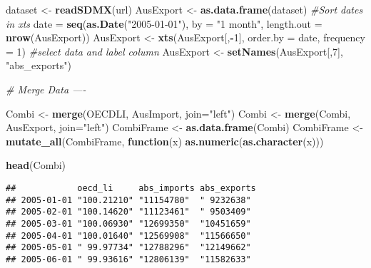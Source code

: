 \documentclass[]{article}
\newenvironment{Shaded}{\begin{snugshade}}{\end{snugshade}}
\newcommand{\KeywordTok}[1]{\textcolor[rgb]{0.13,0.29,0.53}{\textbf{#1}}}
\newcommand{\DataTypeTok}[1]{\textcolor[rgb]{0.13,0.29,0.53}{#1}}
\newcommand{\DecValTok}[1]{\textcolor[rgb]{0.00,0.00,0.81}{#1}}
\newcommand{\StringTok}[1]{\textcolor[rgb]{0.31,0.60,0.02}{#1}}
\newcommand{\CommentTok}[1]{\textcolor[rgb]{0.56,0.35,0.01}{\textit{#1}}}
\newcommand{\ControlFlowTok}[1]{\textcolor[rgb]{0.13,0.29,0.53}{\textbf{#1}}}
\newcommand{\OperatorTok}[1]{\textcolor[rgb]{0.81,0.36,0.00}{\textbf{#1}}}
\newcommand{\NormalTok}[1]{#1}
\begin{document}
\begin{Shaded}
\begin{Highlighting}[]
\NormalTok{dataset <-}\StringTok{ }\KeywordTok{readSDMX}\NormalTok{(url)}
\NormalTok{AusExport <-}\StringTok{ }\KeywordTok{as.data.frame}\NormalTok{(dataset)}
\CommentTok{#Sort dates in xts}
\NormalTok{date =}\StringTok{ }\KeywordTok{seq}\NormalTok{(}\KeywordTok{as.Date}\NormalTok{(}\StringTok{"2005-01-01"}\NormalTok{), }\DataTypeTok{by =} \StringTok{"1 month"}\NormalTok{, }
           \DataTypeTok{length.out =} \KeywordTok{nrow}\NormalTok{(AusExport))}
\NormalTok{AusExport <-}\StringTok{ }\KeywordTok{xts}\NormalTok{(AusExport[,}\OperatorTok{-}\DecValTok{1}\NormalTok{], }\DataTypeTok{order.by =}\NormalTok{ date, }\DataTypeTok{frequency =} \DecValTok{1}\NormalTok{)}
\CommentTok{#select data and label column}
\NormalTok{AusExport <-}\StringTok{  }\KeywordTok{setNames}\NormalTok{(AusExport[,}\DecValTok{7}\NormalTok{], }\StringTok{"abs_exports"}\NormalTok{)}

\CommentTok{# Merge Data ----}

\NormalTok{Combi <-}\StringTok{ }\KeywordTok{merge}\NormalTok{(OECDLI, AusImport, }\DataTypeTok{join=}\StringTok{"left"}\NormalTok{)}
\NormalTok{Combi <-}\StringTok{ }\KeywordTok{merge}\NormalTok{(Combi, AusExport, }\DataTypeTok{join=}\StringTok{"left"}\NormalTok{)}
\NormalTok{CombiFrame <-}\StringTok{ }\KeywordTok{as.data.frame}\NormalTok{(Combi)}
\NormalTok{CombiFrame <-}\StringTok{ }\KeywordTok{mutate_all}\NormalTok{(CombiFrame, }\ControlFlowTok{function}\NormalTok{(x) }\KeywordTok{as.numeric}\NormalTok{(}\KeywordTok{as.character}\NormalTok{(x)))}

\KeywordTok{head}\NormalTok{(Combi)}
\end{Highlighting}
\end{Shaded}

\begin{verbatim}
##            oecd_li     abs_imports abs_exports
## 2005-01-01 "100.21210" "11154780"  " 9232638" 
## 2005-02-01 "100.14620" "11123461"  " 9503409" 
## 2005-03-01 "100.06930" "12699350"  "10451659" 
## 2005-04-01 "100.01640" "12569908"  "11566650" 
## 2005-05-01 " 99.97734" "12788296"  "12149662" 
## 2005-06-01 " 99.93616" "12806139"  "11582633"
\end{verbatim}
\end{document}
